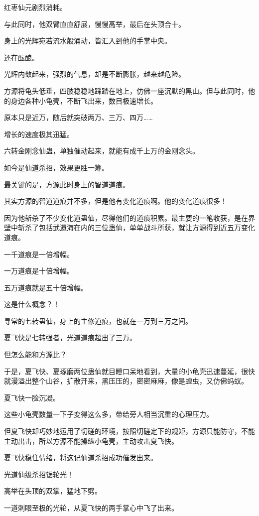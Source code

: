 \begin{this_body}
红枣仙元剧烈消耗。

与此同时，他双臂直直舒展，慢慢高举，最后在头顶合十。

身上的光辉宛若流水般涌动，皆汇入到他的手掌中央。

还在酝酿。

光辉内敛起来，强烈的气息，却是不断膨胀，越来越危险。

方源将龟头低垂，四肢稳稳地踩踏在地上，仿佛一座沉默的黑山。但与此同时，他的身边各种小龟壳，不断飞出来，数目极速增长。

原本只是近万，随后就突破两万、三万、四万……

增长的速度极其迅猛。

六转金刚念仙蛊，单独催动起来，就能有成千上万的金刚念头。

如今是仙道杀招，效果更胜一筹。

最关键的是，方源此时身上的智道道痕。

其实方源的智道道痕并不多，但是他有变化道痕啊。他的变化道痕很多！

因为他斩杀了不少变化道蛊仙，尽得他们的道痕积累。最主要的一笔收获，是在界壁中斩杀了包括武遗海在内的三位蛊仙，单单战斗所获，就让方源得到近五万变化道痕。

一千道痕是一倍增幅。

一万道痕是十倍增幅。

五万道痕就是五十倍增幅。

这是什么概念？！

寻常的七转蛊仙，身上的主修道痕，也就在一万到三万之间。

夏飞快是七转强者，光道道痕超出了三万。

但怎么能和方源比？

于是，夏飞快、夏琢磨两位蛊仙就目瞪口呆地看到，大量的小龟壳迅速蔓延，很快就漫溢出整个山谷，扩散开来，黑压压的，密密麻麻，像是蝗虫，又仿佛蚂蚁。

夏飞快一脸沉凝。

这些小龟壳数量一下子变得这么多，带给旁人相当沉重的心理压力。

但夏飞快却巧妙地运用了切磋的环境，按照切磋定下的规矩，方源只能防守，不能主动出击，所以方源不能操纵小龟壳，主动攻击夏飞快。

夏飞快稳住情绪，将这记仙道杀招成功催发出来。

光道仙级杀招锯轮光！

高举在头顶的双掌，猛地下劈。

一道刺眼至极的光轮，从夏飞快的两手掌心中飞了出来。


\end{this_body}
